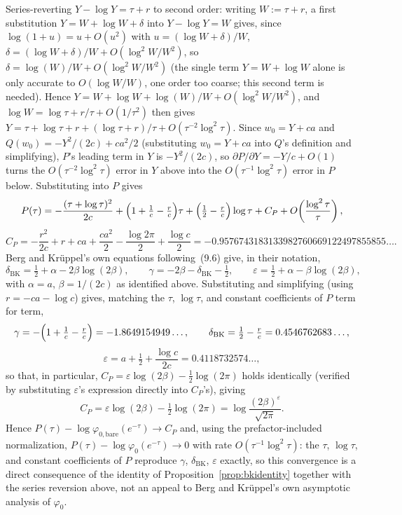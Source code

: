 \documentclass[11pt]{amsart}
\theoremstyle{plain}
\theoremstyle{definition}
\theoremstyle{remark}
\begin{document}
Series-reverting $Y-\log Y=\tau+r$ to second order: writing $W:=\tau+r$, a first substitution
$Y=W+\log W+\delta$ into $Y-\log Y=W$ gives, since $\log(1+u)=u+O(u^2)$ with $u=(\log W+\delta)/W$,
$\delta = (\log W+\delta)/W + O(\log^2W/W^2)$, so $\delta=\log(W)/W+O(\log^2W/W^2)$ (the single
term $Y=W+\log W$ alone is only accurate to $O(\log W/W)$, one order too coarse; this second term
is needed). Hence $Y=W+\log W+\log(W)/W+O(\log^2W/W^2)$, and $\log W=\log\tau+r/\tau+O(1/\tau^2)$
then gives $Y = \tau + \log\tau + r + (\log\tau+r)/\tau + O(\tau^{-2}\log^2\tau)$. Since $w_0=Y+ca$
and
$Q(w_0)=-Y^2/(2c)+ca^2/2$ (substituting $w_0=Y+ca$ into $Q$'s definition and simplifying), $P$'s
leading term in $Y$ is $-Y^2/(2c)$, so $\partial P/\partial Y=-Y/c+O(1)$ turns the
$O(\tau^{-2}\log^2\tau)$ error in $Y$ above into the $O(\tau^{-1}\log^2\tau)$ error in $P$ below.
Substituting into $P$ gives
\[
P(\tau) = -\frac{(\tau+\log\tau)^2}{2c} + \Bigl(1+\tfrac1c-\tfrac{r}{c}\Bigr)\tau +
\Bigl(\tfrac12-\tfrac{r}{c}\Bigr)\log\tau + C_P + O\!\left(\frac{\log^2\tau}{\tau}\right),
\]
\[
C_P = -\frac{r^2}{2c}+r+ca+\frac{ca^2}{2}-\frac{\log2\pi}{2}+\frac{\log c}{2} =
-0.9576743183133982760669122497855855\ldots.
\]
Berg and Kr\"uppel's own equations following~(9.6) give, in their notation,
\[
\delta_{\mathrm{BK}} = \tfrac12+\alpha-2\beta\log(2\beta), \qquad
\gamma = -2\beta-\delta_{\mathrm{BK}}-\tfrac12, \qquad
\varepsilon = \tfrac12+\alpha-\beta\log(2\beta),
\]
with $\alpha=a$, $\beta=1/(2c)$ as identified above. Substituting and simplifying (using
$r=-ca-\log c$) gives, matching the $\tau$, $\log\tau$, and constant coefficients of $P$
term for term,
\[
\gamma = -\Bigl(1+\tfrac1c-\tfrac rc\Bigr) = -1.8649154949\ldots, \qquad
\delta_{\mathrm{BK}} = \tfrac12-\tfrac rc = 0.4546762683\ldots,
\]
\[
\varepsilon = a+\tfrac12+\frac{\log c}{2c} = 0.4118732574\ldots,
\]
so that, in particular, $C_P=\varepsilon\log(2\beta)-\tfrac12\log(2\pi)$ holds identically (verified
by substituting $\varepsilon$'s expression directly into $C_P$'s), giving
\[
C_P = \varepsilon\log(2\beta) - \tfrac12\log(2\pi) = \log\frac{(2\beta)^\varepsilon}{\sqrt{2\pi}}.
\]
Hence $P(\tau) - \log\varphi_{0,\mathrm{bare}}(e^{-\tau}) \to C_P$ and, using the prefactor-included
normalization, $P(\tau) - \log\varphi_0(e^{-\tau}) \to 0$ with rate $O(\tau^{-1}\log^2\tau)$: the
$\tau$, $\log\tau$, and constant coefficients of $P$ reproduce $\gamma$, $\delta_{\mathrm{BK}}$,
$\varepsilon$ exactly, so this convergence is a direct consequence of the identity of
Proposition~\ref{prop:bkidentity} together with the series reversion above, not an appeal to Berg
and Kr\"uppel's own asymptotic analysis of $\varphi_0$.
\end{document}
